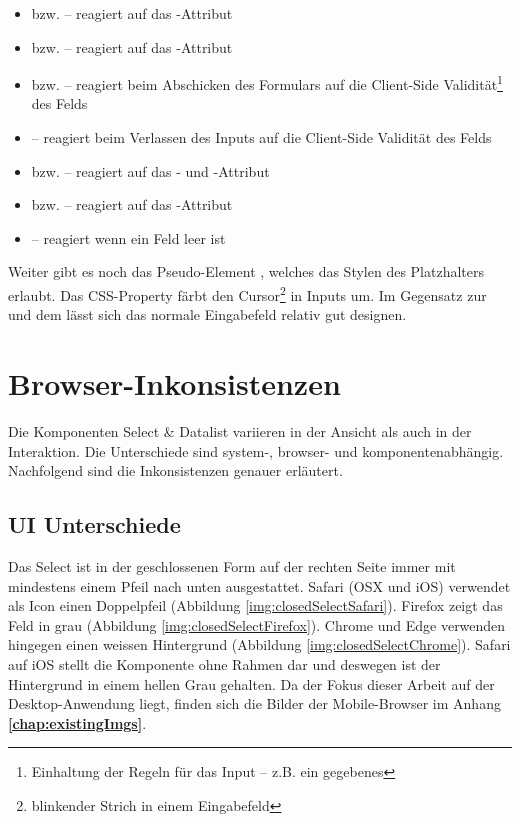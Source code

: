 \begin{itemize}
    \item {} bzw.  – reagiert auf das -Attribut
    \item {} bzw.  – reagiert auf das -Attribut
    \item {} bzw.  – reagiert beim Abschicken des Formulars auf die Client-Side Validität\footnote{
            Einhaltung der Regeln für das Input – z.B. ein gegebenes 
        } des Felds
    \item {} – reagiert beim Verlassen des Inputs auf die Client-Side Validität des Felds
    \item {} bzw.  – reagiert auf das - und -Attribut
    \item {} bzw.  – reagiert auf das -Attribut
    \item {} – reagiert wenn ein Feld leer ist
\end{itemize}

Weiter gibt es noch das Pseudo-Element , welches das Stylen des Platzhalters erlaubt. 
Das CSS-Property  färbt den Cursor\footnote{
    blinkender Strich in einem Eingabefeld
} in Inputs um. 
Im Gegensatz zur  und dem  lässt sich das normale Eingabefeld relativ gut designen. 


\clearpage
\section{Browser-Inkonsistenzen}
\label{sec:browserInconsistency}

Die Komponenten Select \& Datalist variieren in der Ansicht als auch in der Interaktion. 
Die Unterschiede sind system-, browser- und komponentenabhängig.
Nachfolgend sind die Inkonsistenzen genauer erläutert. 


\subsection{UI Unterschiede}
\label{sec:uiDifferences}

Das Select ist in der geschlossenen Form auf der rechten Seite immer mit mindestens einem Pfeil nach unten ausgestattet. 
Safari (OSX und iOS) verwendet als Icon einen Doppelpfeil (Abbildung \ref{img:closedSelectSafari}). 
Firefox zeigt das Feld in grau (Abbildung \ref{img:closedSelectFirefox}). 
Chrome und Edge verwenden hingegen einen weissen Hintergrund (Abbildung \ref{img:closedSelectChrome}). 
Safari auf iOS stellt die Komponente ohne Rahmen dar und deswegen ist der Hintergrund in einem hellen Grau gehalten. 
Da der Fokus dieser Arbeit auf der Desktop-Anwendung liegt, finden sich die Bilder der Mobile-Browser im Anhang \textbf{\ref{chap:existingImgs}}. 

